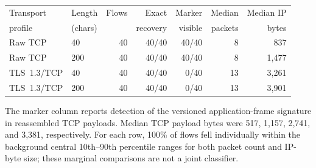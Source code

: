 \begin{tabular}{llrrrrr}
\toprule
Transport & Length & Flows & Exact & Marker & Median & Median IP \\
profile & (chars) & & recovery & visible & packets & bytes \\
\midrule
Raw TCP & 40  & 40 & 40/40 & 40/40 & 8  & 837  \\
Raw TCP & 200 & 40 & 40/40 & 40/40 & 8  & 1,477 \\
TLS~1.3/TCP & 40  & 40 & 40/40 & 0/40 & 13 & 3,261 \\
TLS~1.3/TCP & 200 & 40 & 40/40 & 0/40 & 13 & 3,901 \\
\bottomrule
\end{tabular}

\vspace{2pt}
\parbox{\linewidth}{\footnotesize The marker column reports detection of the
versioned application-frame signature in reassembled TCP payloads. Median TCP
payload bytes were 517, 1,157, 2,741, and 3,381, respectively. For each row,
100\% of flows fell individually within the background central 10th--90th
percentile ranges for both packet count and IP-byte size; these marginal
comparisons are not a joint classifier.}
